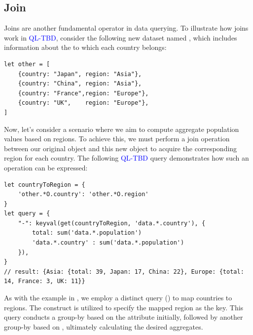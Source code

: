 \documentclass[runningheads]{llncs}
\newcommand{\lang}{\textcolor{blue}{QL-TBD}}
\begin{document}
\subsection{Join}
Joins are another fundamental operator in data querying.
To illustrate how joins work in \lang{}, consider the following
new dataset named , which includes information about the
 to which each country belongs:

\begin{lstlisting}[style=JavaScript, columns=flexible]
let other = [
    {country: "Japan", region: "Asia"},
    {country: "China", region: "Asia"},
    {country: "France",region: "Europe"},
    {country: "UK",    region: "Europe"},
]
\end{lstlisting}

Now, let's consider a scenario where we aim to compute aggregate population
values based on regions.
To achieve this, we must perform a join operation between our original
 object and this new  object to acquire the
corresponding region for each country.
The following \lang{} query demonstrates how such an operation can be
expressed:

\begin{lstlisting}[style=JavaScript, columns=flexible]
let countryToRegion = {
    'other.*O.country': 'other.*O.region'
}
let query = {
    "-": keyval(get(countryToRegion, 'data.*.country'), {
        total: sum('data.*.population')
        'data.*.country' : sum('data.*.population')
    }),
}
// result: {Asia: {total: 39, Japan: 17, China: 22}, Europe: {total: 14, France: 3, UK: 11}}
\end{lstlisting}

As with the example in , we employ a distinct query
() to map countries to regions.
The  construct is utilized to specify the mapped region
as the key.
This query conducts a group-by based on the  attribute initially,
followed by another group-by based on , ultimately calculating the
desired aggregates.

\end{document}
